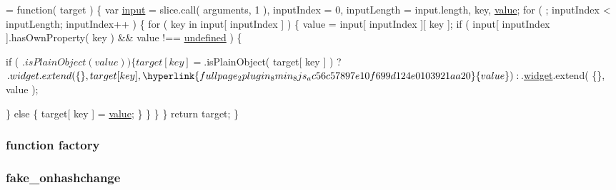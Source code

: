 \begin{DoxyCode}
= \textcolor{keyword}{function}( target ) \{
    var \hyperlink{validate_8js_a07a2aabd64594dc36dd810cad2669deb}{input} = slice.call( arguments, 1 ),
        inputIndex = 0,
        inputLength = input.length,
        key,
        \hyperlink{fullpage_2plugin_8min_8js_ac56c57897e10f699d124e0103921aa20}{value};
    \textcolor{keywordflow}{for} ( ; inputIndex < inputLength; inputIndex++ ) \{
        \textcolor{keywordflow}{for} ( key in input[ inputIndex ] ) \{
            value = input[ inputIndex ][ key ];
            \textcolor{keywordflow}{if} ( input[ inputIndex ].hasOwnProperty( key ) && value !== 
      \hyperlink{jquery_8mobile-1_83_81_8js_a08113a236cc18d2a9d5ce27e638012be}{undefined} ) \{
                
                \textcolor{keywordflow}{if} ( $.isPlainObject( value ) ) \{
                    target[ key ] = $.isPlainObject( target[ key ] ) ?
                        $.widget.extend( \{\}, target[ key ], \hyperlink{fullpage_2plugin_8min_8js_ac56c57897e10f699d124e0103921aa20}{value} ) :
                        
                        $.\hyperlink{jquery_8mobile-1_83_81_8js_a60d5947424f4fcd4ca9ed05e6dc43227}{widget}.extend( \{\}, value );
                
                \} \textcolor{keywordflow}{else} \{
                    target[ key ] = \hyperlink{fullpage_2plugin_8min_8js_ac56c57897e10f699d124e0103921aa20}{value};
                \}
            \}
        \}
    \}
    \textcolor{keywordflow}{return} target;
\}
\end{DoxyCode}
\hypertarget{jquery_8mobile-1_83_81_8js_abf075bdbe59fd2c3336ed052c9c72b31}{
\subsubsection[{factory}]{\setlength{\rightskip}{0pt plus 5cm}function factory}}\label{jquery_8mobile-1_83_81_8js_abf075bdbe59fd2c3336ed052c9c72b31}
\hypertarget{jquery_8mobile-1_83_81_8js_ae8a6978b62641d58e1218a69571ae6be}{
\subsubsection[{fake\+\_\+onhashchange}]{\setlength{\rightskip}{0pt plus 5cm}fake\+\_\+onhashchange}}\label{jquery_8mobile-1_83_81_8js_ae8a6978b62641d58e1218a69571ae6be}
